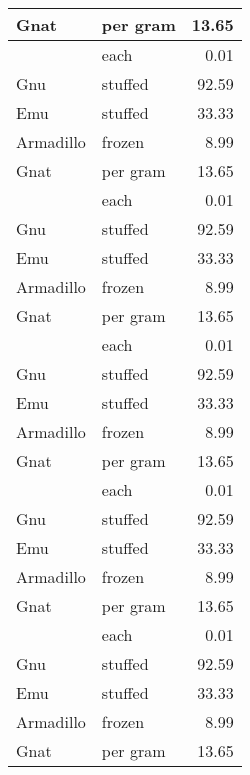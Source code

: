 {\begin{longtable}[l]{llr}
\endlastfoot
\rowcolor{latextbl!25}Gnat      & per gram & 13.65 \\
\hline
\rowcolor{latextbl!10}          & each     & 0.01  \\
\hline
\rowcolor{latextbl!25}Gnu       & stuffed  & 92.59 \\
\hline
\rowcolor{latextbl!10}Emu       & stuffed  & 33.33 \\
\hline
\rowcolor{latextbl!25}Armadillo & frozen   & 8.99  \\
\hline
\rowcolor{latextbl!10}Gnat      & per gram & 13.65 \\
\hline
\rowcolor{latextbl!25}          & each     & 0.01  \\
\hline
\rowcolor{latextbl!10}Gnu       & stuffed  & 92.59 \\
\hline
\rowcolor{latextbl!25}Emu       & stuffed  & 33.33 \\
\hline
\rowcolor{latextbl!10}Armadillo & frozen   & 8.99  \\
\hline
\rowcolor{latextbl!25}Gnat      & per gram & 13.65 \\
\hline
\rowcolor{latextbl!10}          & each     & 0.01  \\
\hline
\rowcolor{latextbl!25}Gnu       & stuffed  & 92.59 \\
\hline
\rowcolor{latextbl!10}Emu       & stuffed  & 33.33 \\
\hline
\rowcolor{latextbl!25}Armadillo & frozen   & 8.99  \\
\hline
\rowcolor{latextbl!10}Gnat      & per gram & 13.65 \\
\hline
\rowcolor{latextbl!25}          & each     & 0.01  \\
\hline
\rowcolor{latextbl!10}Gnu       & stuffed  & 92.59 \\
\hline
\rowcolor{latextbl!25}Emu       & stuffed  & 33.33 \\
\hline
\rowcolor{latextbl!10}Armadillo & frozen   & 8.99  \\
\hline
\rowcolor{latextbl!25}Gnat      & per gram & 13.65 \\
\hline
\rowcolor{latextbl!10}          & each     & 0.01  \\
\hline
\rowcolor{latextbl!25}Gnu       & stuffed  & 92.59 \\
\hline
\rowcolor{latextbl!10}Emu       & stuffed  & 33.33 \\
\hline
\rowcolor{latextbl!25}Armadillo & frozen   & 8.99  \\
\hline
\rowcolor{latextbl!10}Gnat      & per gram & 13.65 \\

\end{longtable}}
